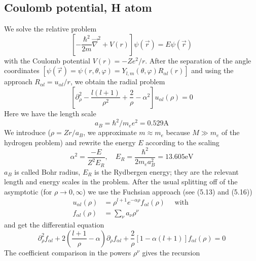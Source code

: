 \subsection{Coulomb potential, H atom}
We solve the relative problem
\begin{equation}
    \left[-\frac{\hbar^{2}}{2 m} \vec{\nabla}^{2}+V(r)\right] \psi(\vec{r})=E \psi(\vec{r})
    \end{equation}
with the Coulomb potential $V (r) = -Z e^2 / r$. After the separation of the angle coordinates $[\psi (\vec{r}) = \psi (r, \theta, \varphi) = Y_{l, m}(\theta, \varphi) R_{\alpha l} (r)]$ and using the approach $R_{\alpha l} = u_{\alpha l} / r$, we obtain the radial problem
\begin{equation}
    \left[\partial_{\rho}^{2}-\frac{l(l+1)}{\rho^{2}}+\frac{2}{\rho}-\alpha^{2}\right] u_{\alpha l}(\rho)=0
    \end{equation}
Here we have the length scale
\begin{equation}
    a_{B}=\hbar^{2} / m_{e} e^{2}=0.529 \mathrm{A}
    \end{equation}
We introduce ($\rho = Zr / a_B$, we approximate $m \approx m_e$ because $M\gg m_e$ of the hydrogen problem) and rewrite the energy $E$ according to the scaling
\begin{equation}
    \alpha^{2}=\frac{-E}{Z^{2} E_{R}}, \quad E_{R}=\frac{\hbar^{2}}{2 m_{e} a_{B}^{2}}=13.605 \mathrm{eV}
    \end{equation}
$a_B$ is called Bohr radius, $E_R$ is the Rydbergen energy; they are the relevant length and energy scales in the problem. After the usual splitting off of the asymptotic (for $\rho \rightarrow 0, \infty$) we use the Fuchsian approach (see (5.13) and (5.16))
\begin{equation}
\begin{aligned} u_{\alpha l}(\rho) &=\rho^{l+1} e^{-\alpha \rho} f_{\alpha l}(\rho) \quad \text { with } \\ f_{\alpha l}(\rho) &=\sum_{\nu} a_{\nu} \rho^{\nu} \end{aligned}
\end{equation}
and get the differential equation
\begin{equation}
    \partial_{\rho}^{2} f_{\alpha l}+2\left(\frac{l+1}{\rho}-\alpha\right) \partial_{\rho} f_{\alpha l}+\frac{2}{\rho}[1-\alpha(l+1)] f_{\alpha l}(\rho)=0
    \end{equation}
The coefficient comparison in the powers $\rho^{\nu}$ gives the recursion

